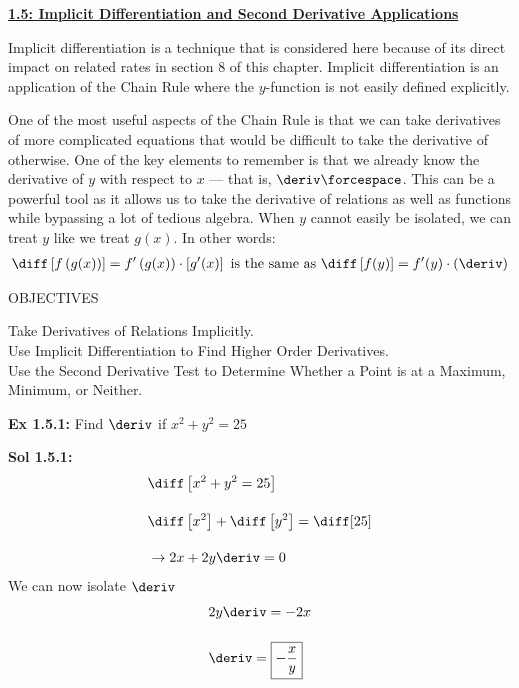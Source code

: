 \textbf{\underline{\large{1.5: Implicit Differentiation and Second Derivative Applications}}} \par

Implicit differentiation is a technique that is considered here because of its direct impact on related rates in section 8 of this chapter. Implicit differentiation is an application of the Chain Rule where the $y$-function is not easily defined explicitly. \par 

One of the most useful aspects of the Chain Rule is that we can take derivatives of more complicated equations that would be difficult to take the derivative of otherwise. One of the key elements to remember is that we already know the derivative of $y$ with respect to $x$ --- that is, $\deriv \forcespace$. This can be a powerful tool as it allows us to take the derivative of relations as well as functions while bypassing a lot of tedious algebra. When $y$ cannot easily be isolated, we can treat $y$ like we treat $g(x)$. In other words: \begin{align*}
    \diff \left[f\left(g(x)\right)\right] = f'\left(g(x)\right) \cdot \left[g'(x)\right] \text{ is the same as } \diff \left[f(y)\right] = f'(y) \cdot \left(\deriv\right)
\end{align*}

\begin{tcolorbox}[objective]
    \begin{center}
        OBJECTIVES \\[11pt]
    \end{center}
    Take Derivatives of Relations Implicitly. \\
    Use Implicit Differentiation to Find Higher Order Derivatives. \\
    Use the Second Derivative Test to Determine Whether a Point is at a Maximum, Minimum, or Neither.
\end{tcolorbox} \vspace{11pt}

\begin{tcolorbox}[example]
    \textbf{Ex 1.5.1: } Find $\deriv$ if $x^2 + y^2 = 25$
\end{tcolorbox}
\begin{tcolorbox}[solution]
    \textbf{Sol 1.5.1: } \begin{align*}
        & \diff \left[x^2 + y^2 = 25\right] \\[11pt]
        & \diff \left[x^2\right] + \diff \left[y^2\right] = \diff [25] \\[11pt]
        & \rightarrow 2x + 2y\deriv = 0 
    \end{align*}
    We can now isolate $\deriv$ \begin{align*}
        & 2y\deriv = -2x \\[11pt]
        & \deriv = \boxed{-\dfrac{x}{y}}
    \end{align*}
\end{tcolorbox}


